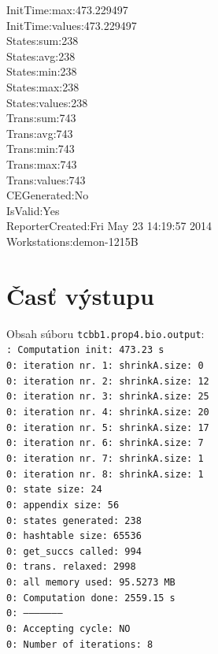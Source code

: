 \documentclass[11pt,final,oneside]{fithesis}
\begin{document}
{InitTime:max:473.229497\\
InitTime:values:473.229497\\
States:sum:238\\
States:avg:238\\
States:min:238\\
States:max:238\\
States:values:238\\
Trans:sum:743\\
Trans:avg:743\\
Trans:min:743\\
Trans:max:743\\
Trans:values:743\\
CEGenerated:No\\
IsValid:Yes\\
ReporterCreated:Fri May 23 14:19:57 2014\\
Workstations:demon-1215B\\
}


\section{\v Cas\v t v\'ystupu}
\label{sec:prop4output}
Obsah s\'uboru {\tt tcbb1.prop4.bio.output}:\\

{\tt{}: Computation init:  473.23 s\\
0: iteration nr. 1: shrinkA.size: 0\\
0: iteration nr. 2: shrinkA.size: 12\\
0: iteration nr. 3: shrinkA.size: 25\\
0: iteration nr. 4: shrinkA.size: 20\\
0: iteration nr. 5: shrinkA.size: 17\\
0: iteration nr. 6: shrinkA.size: 7\\
0: iteration nr. 7: shrinkA.size: 1\\
0: iteration nr. 8: shrinkA.size: 1\\
 0: state size:		24\\
 0: appendix size:	56\\
 0: states generated:	238\\
 0: hashtable size:	65536\\
 0: get\_succs called:	994\\
 0: trans. relaxed:	2998\\
 0: all memory used:	95.5273 MB\\
 0: Computation done:	2559.15 s\\
 0: --------------------\\
 0: Accepting cycle:	NO\\
 0: Number of iterations:	8\\
}
\end{document}
